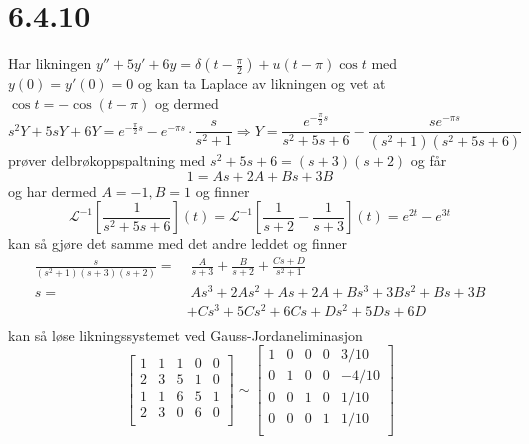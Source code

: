 \documentclass{report}
\newcommand{\nbrack}[1]{\left( #1 \right)}
\newcommand{\bbrack}[1]{\left[ #1 \right]}
\newcommand{\iLplc}[1]{\mathscr{L}^{-1}\bbrack{ #1 } (t)}
\begin{document}
\section*{6.4.10}
Har likningen $y'' + 5y' + 6y = \delta \nbrack{t - \frac{\pi}{2}} + u\nbrack{t - \pi} \cos t$ med $y(0) = y'(0) = 0$ og kan ta Laplace av likningen og vet at $\cos t = -\cos \nbrack{t - \pi}$ og dermed
\begin{equation}
  \label{eq:5}
  s^{2}Y + 5sY + 6Y = e^{-\frac{\pi}{2}s} - e^{-\pi s}\cdot \frac{s}{s^{2} + 1}
  \Rightarrow Y = \frac{e^{-\frac{\pi}{2}s}}{s^{2} + 5s + 6} - \frac{se^{-\pi s}}{\nbrack{s^{2} + 1}\nbrack{s^{2} + 5s + 6}}
\end{equation}
prøver delbrøkoppspaltning med $s^{2}+5s+6 = (s+3)(s+2)$ og får
\begin{equation}
  \label{eq:6}
  1 = As + 2A + Bs + 3B
\end{equation}
og har dermed $A = -1, B = 1$ og finner
\begin{equation}
  \label{eq:7}
  \iLplc{\frac{1}{s^{2}+5s+6}} = \iLplc{\frac{1}{s+2} - \frac{1}{s+3}} = e^{2t} - e^{3t}
\end{equation}
kan så gjøre det samme med det andre leddet og finner
\begin{equation}
  \label{eq:8}
  \begin{split}
    \frac{s}{\nbrack{s^{2} + 1}(s+3)(s+2)} =& \; \frac{A}{s+3} + \frac{B}{s+2} + \frac{Cs+D}{s^{2}+1} \\
    s =& \; As^{3} + 2As^{2} + As + 2A + Bs^{3} + 3Bs^{2} + Bs + 3B \\
                                            &+ Cs^{3} + 5Cs^{2} + 6Cs + Ds^{2} + 5Ds + 6D \\
  \end{split}
\end{equation}
kan så løse likningssystemet ved Gauss-Jordaneliminasjon
\begin{equation}
  \label{eq:9}
  \bbrack{
    \begin{array}{cccc|c}
      1 & 1 & 1 & 0 & 0 \\
      2 & 3 & 5 & 1 & 0 \\
      1 & 1 & 6 & 5 & 1 \\
      2 & 3 & 0 & 6 & 0 \\
    \end{array}
  } \sim
  \bbrack{
    \begin{array}{cccc|c}
      1 & 0 & 0 & 0 & 3/10 \\
      0 & 1 & 0 & 0 & -4/10 \\
      0 & 0 & 1 & 0 & 1/10 \\
      0 & 0 & 0 & 1 & 1/10 \\
    \end{array}
  }
\end{equation}
\end{document}
